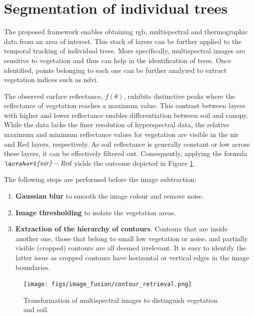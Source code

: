 \section{Segmentation of individual trees}

The proposed framework enables obtaining \acrshort{rgb}, multispectral and thermographic data from an area of interest. This stack of layers can be further applied to the temporal tracking of individual trees. More specifically, multispectral images are sensitive to vegetation and thus can help in the identification of trees. Once identified, points belonging to each one can be further analyzed to extract vegetation indices such as \acrshort{ndvi}. 

The observed surface reflectance, $f(\theta)$, exhibits distinctive peaks where the reflectance of vegetation reaches a maximum value. This contrast between layers with higher and lower reflectance enables differentiation between soil and canopy. While the data lacks the finer resolution of hyperspectral data, the relative maximum and minimum reflectance values for vegetation are visible in the \acrshort{nir} and Red layers, respectively. As soil reflectance is generally constant or low across these layers, it can be effectively filtered out. Consequently, applying the formula $\textit{\acrshort{nir}} - \textit{Red}$ yields the outcome depicted in Figure \ref{fig:contour_extraction}.

The following steps are performed before the image subtraction:
\begin{enumerate}
    \item \textbf{Gaussian blur} to smooth the image colour and remove noise.
    \item \textbf{Image thresholding} to isolate the vegetation areas.
    \item \textbf{Extraction of the hierarchy of contours}. Contours that are inside another one, those that belong to small low vegetation or noise, and partially visible (cropped) contours are all deemed irrelevant. It is easy to identify the latter issue as cropped contours have horizontal or vertical edges in the image boundaries.
\end{enumerate}

\begin{figure}[hbt]
	\centering
	\texttt{[image: figs/image\_fusion/contour\_retrieval.png]}
	\caption{Transformation of multispectral images to distinguish vegetation and soil.}
	\label{fig:contour_extraction}
\end{figure}

